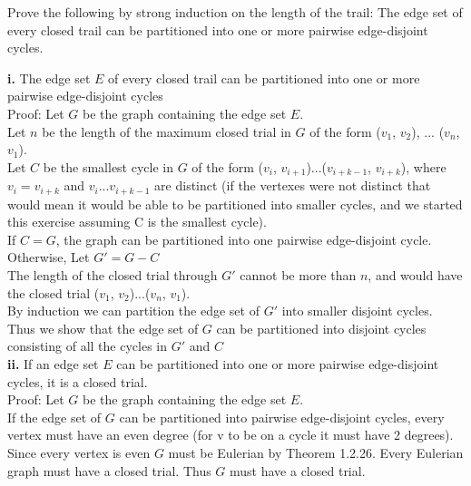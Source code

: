 \documentclass[12pt]{article}
\newenvironment{question}[2][Question]{\begin{trivlist}
\item[\hskip \labelsep {\bfseries #1}\hskip \labelsep {\bfseries #2.}]}{\end{trivlist}}
\begin{document}
\begin{question}{3}
Prove the following by strong induction on the length of the trail: The edge set of every closed trail can be partitioned into one or more pairwise edge-disjoint cycles.
\end{question}

\textbf{i.} The edge set $E$ of every closed trail can be partitioned into one or more pairwise edge-disjoint cycles\\

Proof: Let $G$ be the graph containing the edge set $E$. \\

Let $n$ be the length of the maximum closed trial in $G$ of the form ($v_1$, $v_2$), ... ($v_n$, $v_1$). \\

Let $C$ be the smallest cycle in $G$ of the form ($v_i$, $v_{i+1}$)...($v_{i+k-1}$, $v_{i+k}$), where $v_i = v_{i+k}$ and $v_i$...$v_{i+k-1}$ are distinct (if the vertexes were not distinct that would mean it would be able to be partitioned into smaller cycles, and we started this exercise assuming C is the smallest cycle). \\

If $C = G$, the graph can be partitioned into one pairwise edge-disjoint cycle.\\

Otherwise, Let $G' = G - C$\\

The length of the closed trial through $G'$ cannot be more than $n$, and would have the closed trial ($v_1$, $v_2$)...($v_n$, $v_1$). \\

By induction we can partition the edge set of $G'$ into smaller disjoint cycles. Thus we show that the edge set of $G$ can be partitioned into disjoint cycles consisting of all the cycles in $G'$ and $C$\\

\textbf{ii.} If an edge set $E$ can be partitioned into one or more pairwise edge-disjoint cycles, it is a closed trial. \\

Proof: Let $G$ be the graph containing the edge set $E$.\\

If the edge set of $G$ can be partitioned into pairwise edge-disjoint cycles, every vertex must have an even degree (for v to be on a cycle it must have 2 degrees). Since every vertex is even $G$ must be Eulerian by Theorem 1.2.26. Every Eulerian graph must have a closed trial. Thus $G$ must have a closed trial.
\end{document}
